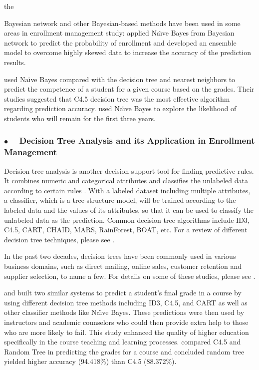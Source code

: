 \documentclass[12pt,english]{report}
\begin{document}
the

Bayesian network and other Bayesian-based methods have been used in some areas 
in enrollment  management study: \citet{Thanh2007} applied Na{\"\i}ve Bayes 
from Bayesian network to predict the probability of enrollment and developed 
an ensemble model to overcome highly skewed data to increase the accuracy of 
the prediction results.

\citet{dt_enroll_academic} used Na{\"\i}ve Bayes compared with the decision 
tree and nearest neighbors to predict the competence of a student for a given 
course based on the grades. Their studies suggested that C4.5 decision tree 
was the most effective algorithm regarding prediction accuracy. 
\citet{nandeshwarlearning2011} used Na{\"\i}ve Bayes to explore the likelihood 
of students who will remain for the first three years.

\subsubsection{$\bullet \quad$  Decision Tree Analysis and its Application in
Enrollment Management}

Decision tree analysis is another decision support tool for finding predictive
rules. 
It combines numeric and categorical attributes and classifies the unlabeled
data 
according to certain rules \citep{Han2011}. With a labeled dataset including
multiple
attributes, a classifier, which is a tree-structure model, will be trained 
according  to the labeled data and the values of its attributes, so that it can
be used to classify
the unlabeled data as the prediction. Common decision tree algorithms include
ID3, C4.5,
CART, CHAID, MARS, RainForest, BOAT, etc. For a review of different decision
tree techniques,
please see \citep{Loh2011}.

In the past two decades, decision trees have been commonly used in various
business domains,
such as direct mailing, online sales, customer retention and supplier
selection, to name a few. 
For details on some of these studies, please see \citep{Berry2004}.

\citet{dt_performance} and \citet{dt_performance1} built two similar systems to
predict a 
student's final grade in a course by using different decision tree methods
including ID3, C4.5,
and CART as well as other classifier methods like Na{\"\i}ve Bayes. These
predictions were then
used by instructors and academic counselors who could then provide extra help
to those who are
more likely to fail. This study enhanced the quality of higher education
specifically in the 
course teaching and learning processes. \citet{dt_performance2} compared C4.5
and Random Tree
in predicting the grades for a course and concluded random tree yielded higher
accuracy
(94.418\%) than C4.5 (88.372\%).
\end{document}
